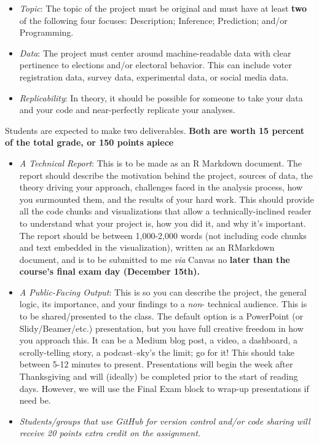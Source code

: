 \documentclass[11pt]{article}
\begin{document}
\begin{itemize}
\begin{itemize}
\item \textit{Topic}: The topic of the project must be original and must have at least \textbf{two} of the following four focuses: Description; Inference; Prediction; and/or Programming.
\item \textit{Data}: The project must center around machine-readable data with clear pertinence to elections and/or electoral behavior. This can include voter registration data, survey data, experimental data, or social media data. 
\item \textit{Replicability}: In theory, it should be possible for someone to take your data and your code and near-perfectly replicate your analyses.   
\end{itemize}

Students are expected to make two deliverables. \textbf{Both are worth 15 percent of the total grade, or 150 points apiece} 

\begin{itemize}
\item \textit{A Technical Report}: This is to be made as an R Markdown document. The report should describe the motivation behind the project, sources of data, the theory driving your approach, challenges faced in the analysis process, how you surmounted them, and the results of your hard work. This should provide all the code chunks and visualizations that allow a technically-inclined reader to understand what your project is, how you did it, and why it's important. The report should be between 1,000-2,000 words (not including code chunks and text embedded in the visualization), written as an RMarkdown document, and is to be submitted to me \textit{via} Canvas no \textbf{later than the course's final exam day (December 15th).}
\item \textit{A Public-Facing Output}: This is so you can describe the project, the general logic, its importance, and your findings to a \textit{non}- technical audience. This is to be shared/presented to the class. The default option is a PowerPoint (or Slidy/Beamer/etc.) presentation, but you have full creative freedom in how you approach this. It can be a Medium blog post, a video, a dashboard, a scrolly-telling story, a podcast--sky's the limit; go for it! This should take between 5-12 minutes to present. Presentations will begin the week after Thanksgiving and will (ideally) be completed prior to the start of reading days. However, we will use the Final Exam block to wrap-up presentations if need be.
\item \textit{Students/groups that use GitHub for version control and/or code sharing will receive 20 points extra credit on the assignment.}
\end{itemize} 


\end{itemize}
\end{document}
